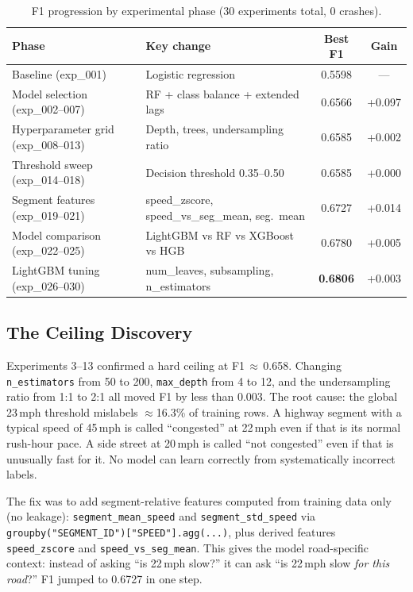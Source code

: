 \documentclass{article}
\begin{document}
\begin{table}[h]
\caption{F1 progression by experimental phase (30 experiments total, 0 crashes).}
\label{tab:phases}
\centering
\begin{tabular}{llcc}
\toprule
Phase & Key change & Best F1 & Gain \\
\midrule
Baseline (exp\_001) & Logistic regression & 0.5598 & --- \\
Model selection (exp\_002--007) & RF + class balance + extended lags & 0.6566 & +0.097 \\
Hyperparameter grid (exp\_008--013) & Depth, trees, undersampling ratio & 0.6585 & +0.002 \\
Threshold sweep (exp\_014--018) & Decision threshold 0.35--0.50 & 0.6585 & +0.000 \\
Segment features (exp\_019--021) & speed\_zscore, speed\_vs\_seg\_mean, seg.\ mean & 0.6727 & +0.014 \\
Model comparison (exp\_022--025) & LightGBM vs RF vs XGBoost vs HGB & 0.6780 & +0.005 \\
LightGBM tuning (exp\_026--030) & num\_leaves, subsampling, n\_estimators & \textbf{0.6806} & +0.003 \\
\bottomrule
\end{tabular}
\end{table}

\subsection{The Ceiling Discovery}

Experiments 3--13 confirmed a hard ceiling at F1\,$\approx$\,0.658.
Changing \texttt{n\_estimators} from 50 to 200, \texttt{max\_depth} from 4 to 12,
and the undersampling ratio from 1:1 to 2:1 all moved F1 by less than 0.003.
The root cause: the global 23\,mph threshold mislabels $\approx$16.3\% of training rows.
A highway segment with a typical speed of 45\,mph is called ``congested'' at 22\,mph
even if that is its normal rush-hour pace. A side street at 20\,mph is called
``not congested'' even if that is unusually fast for it. No model can learn correctly
from systematically incorrect labels.

The fix was to add segment-relative features computed from training data only
(no leakage): \texttt{segment\_mean\_speed} and \texttt{segment\_std\_speed} via
\texttt{groupby("SEGMENT\_ID")["SPEED"].agg(...)}, plus derived features
\texttt{speed\_zscore} and \texttt{speed\_vs\_seg\_mean}. This gives the model
road-specific context: instead of asking ``is 22\,mph slow?'' it can ask
``is 22\,mph slow \textit{for this road}?'' F1 jumped to 0.6727 in one step.
\end{document}

